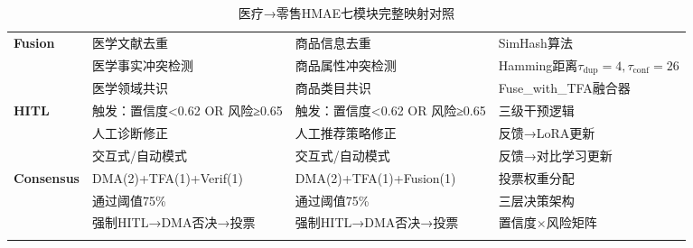 \documentclass[11pt,a4paper]{ctexart}
\theoremstyle{remark}
\begin{document}
\begin{longtable}{p{2.2cm}|p{4.5cm}|p{4.5cm}|p{3cm}}
\textbf{Fusion} &
医学文献去重 &
商品信息去重 &
SimHash算法\\
& 医学事实冲突检测 &
商品属性冲突检测 &
Hamming距离$\tau_{\text{dup}}=4,\tau_{\text{conf}}=26$\\
& 医学领域共识 &
商品类目共识 &
Fuse\_with\_TFA融合器 \\
\midrule

\textbf{HITL} &
触发：置信度<0.62 OR 风险≥0.65 &
触发：置信度<0.62 OR 风险≥0.65 &
三级干预逻辑\\
& 人工诊断修正 &
人工推荐策略修正 &
反馈→LoRA更新\\
& 交互式/自动模式 &
交互式/自动模式 &
反馈→对比学习更新 \\
\midrule

\textbf{Consensus} &
DMA(2)+TFA(1)+Verif(1) &
DMA(2)+TFA(1)+Fusion(1) &
投票权重分配\\
& 通过阈值75\% &
通过阈值75\% &
三层决策架构\\
& 强制HITL→DMA否决→投票 &
强制HITL→DMA否决→投票 &
置信度×风险矩阵 \\
\midrule

\caption{医疗→零售HMAE七模块完整映射对照}
\label{tab:full_mapping}
\end{longtable}

\newpage
\end{document}
